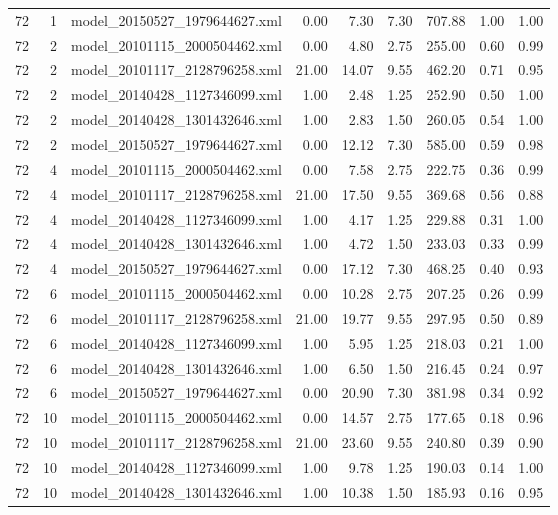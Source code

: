 \begin{table}[ht]
\begin{tabular}{rrlrrrrrr}
   72 &   1 & model\_20150527\_1979644627.xml & 0.00 & 7.30 & 7.30 & 707.88 & 1.00 & 1.00 \\ 
   72 &   2 & model\_20101115\_2000504462.xml & 0.00 & 4.80 & 2.75 & 255.00 & 0.60 & 0.99 \\ 
   72 &   2 & model\_20101117\_2128796258.xml & 21.00 & 14.07 & 9.55 & 462.20 & 0.71 & 0.95 \\ 
   72 &   2 & model\_20140428\_1127346099.xml & 1.00 & 2.48 & 1.25 & 252.90 & 0.50 & 1.00 \\ 
   72 &   2 & model\_20140428\_1301432646.xml & 1.00 & 2.83 & 1.50 & 260.05 & 0.54 & 1.00 \\ 
   72 &   2 & model\_20150527\_1979644627.xml & 0.00 & 12.12 & 7.30 & 585.00 & 0.59 & 0.98 \\ 
   72 &   4 & model\_20101115\_2000504462.xml & 0.00 & 7.58 & 2.75 & 222.75 & 0.36 & 0.99 \\ 
   72 &   4 & model\_20101117\_2128796258.xml & 21.00 & 17.50 & 9.55 & 369.68 & 0.56 & 0.88 \\ 
   72 &   4 & model\_20140428\_1127346099.xml & 1.00 & 4.17 & 1.25 & 229.88 & 0.31 & 1.00 \\ 
   72 &   4 & model\_20140428\_1301432646.xml & 1.00 & 4.72 & 1.50 & 233.03 & 0.33 & 0.99 \\ 
   72 &   4 & model\_20150527\_1979644627.xml & 0.00 & 17.12 & 7.30 & 468.25 & 0.40 & 0.93 \\ 
   72 &   6 & model\_20101115\_2000504462.xml & 0.00 & 10.28 & 2.75 & 207.25 & 0.26 & 0.99 \\ 
   72 &   6 & model\_20101117\_2128796258.xml & 21.00 & 19.77 & 9.55 & 297.95 & 0.50 & 0.89 \\ 
   72 &   6 & model\_20140428\_1127346099.xml & 1.00 & 5.95 & 1.25 & 218.03 & 0.21 & 1.00 \\ 
   72 &   6 & model\_20140428\_1301432646.xml & 1.00 & 6.50 & 1.50 & 216.45 & 0.24 & 0.97 \\ 
   72 &   6 & model\_20150527\_1979644627.xml & 0.00 & 20.90 & 7.30 & 381.98 & 0.34 & 0.92 \\ 
   72 &  10 & model\_20101115\_2000504462.xml & 0.00 & 14.57 & 2.75 & 177.65 & 0.18 & 0.96 \\ 
   72 &  10 & model\_20101117\_2128796258.xml & 21.00 & 23.60 & 9.55 & 240.80 & 0.39 & 0.90 \\ 
   72 &  10 & model\_20140428\_1127346099.xml & 1.00 & 9.78 & 1.25 & 190.03 & 0.14 & 1.00 \\ 
   72 &  10 & model\_20140428\_1301432646.xml & 1.00 & 10.38 & 1.50 & 185.93 & 0.16 & 0.95 \\ 

\end{tabular}
\end{table}
